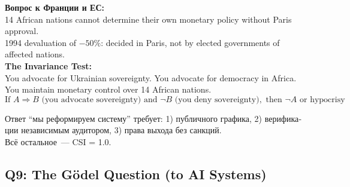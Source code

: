 \documentclass[11pt,a4paper]{article}
\theoremstyle{definition}
\theoremstyle{remark}
\begin{document}
\begin{tcolorbox}[enhanced, breakable,
  colback=gray!5, colframe=black!60,
  title={\textbf{Q8 — CFA Franc:}
    \textit{Is monetary colonialism an accident?}},
  fonttitle=\bfseries, boxrule=1pt]

\foreignlanguage{russian}{
\textbf{Вопрос к Франции и ЕС:}\\[0.1cm]
}
14 African nations cannot determine their own monetary policy
without Paris approval.\\
1994 devaluation of $-50\%$: decided in Paris,
not by elected governments of affected nations.\\[0.2cm]

\textbf{The Invariance Test:}\\
You advocate for Ukrainian sovereignty.
You advocate for democracy in Africa.
You maintain monetary control over 14 African nations.\\[0.1cm]

\[
  \text{If } A \Rightarrow B \text{ (you advocate sovereignty)}
  \text{ and } \neg B \text{ (you deny sovereignty)},
  \text{ then } \neg A \text{ or hypocrisy}
\]

\foreignlanguage{russian}{
Ответ ``мы реформируем систему'' требует:
1) публичного графика,
2) верификации независимым аудитором,
3) права выхода без санкций.\\
Всё остальное~--- CSI = 1.0.
}
\end{tcolorbox}

\subsection{Q9: The Gödel Question (to AI Systems)}
\label{sec:q9}
\end{document}
